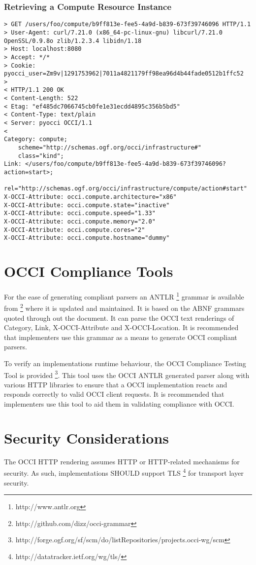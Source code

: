 \documentclass[10pt,a4paper]{article}
\begin{document}
\subsubsection{Retrieving a Compute Resource Instance}
\begin{verbatim}
> GET /users/foo/compute/b9ff813e-fee5-4a9d-b839-673f39746096 HTTP/1.1
> User-Agent: curl/7.21.0 (x86_64-pc-linux-gnu) libcurl/7.21.0 OpenSSL/0.9.8o zlib/1.2.3.4 libidn/1.18
> Host: localhost:8080
> Accept: */*
> Cookie: pyocci_user=Zm9v|1291753962|7011a4821179ff98ea96d4b44fade0512b1ffc52
> 
< HTTP/1.1 200 OK
< Content-Length: 522
< Etag: "ef485dc7066745cb0fe1e31ecdd4895c356b5bd5"
< Content-Type: text/plain
< Server: pyocci OCCI/1.1
< 
Category: compute;
    scheme="http://schemas.ogf.org/occi/infrastructure#"
    class="kind";
Link: </users/foo/compute/b9ff813e-fee5-4a9d-b839-673f39746096?action=start>;
    rel="http://schemas.ogf.org/occi/infrastructure/compute/action#start"
X-OCCI-Attribute: occi.compute.architecture="x86"
X-OCCI-Attribute: occi.compute.state="inactive"
X-OCCI-Attribute: occi.compute.speed="1.33"
X-OCCI-Attribute: occi.compute.memory="2.0"
X-OCCI-Attribute: occi.compute.cores="2"
X-OCCI-Attribute: occi.compute.hostname="dummy"
\end{verbatim}

\section{OCCI Compliance Tools}
For the ease of generating compliant parsers an
ANTLR \footnote{http://www.antlr.org} grammar is available
from \footnote{http://github.com/dizz/occi-grammar} where it is
updated and maintained. It is based on the ABNF grammars quoted
through out the document. It can parse the OCCI text renderings of
Category, Link, X-OCCI-Attribute and X-OCCI-Location. It is
recommended that implementers use this grammar as a means to generate
OCCI compliant parsers.

To verify an implementations runtime behaviour, the OCCI Compliance
Testing Tool is provided
\footnote{http://forge.ogf.org/sf/scm/do/listRepositories/projects.occi-wg/scm}.
This tool uses the OCCI ANTLR generated parser along with various HTTP
libraries to ensure that a OCCI implementation reacts and responds
correctly to valid OCCI client requests. It is recommended that
implementers use this tool to aid them in validating compliance with
OCCI.

\section{Security Considerations}
\label{sec:sec_consid}
The OCCI HTTP rendering assumes HTTP or HTTP-related mechanisms for
security. As such, implementations SHOULD support
TLS \footnote{http://datatracker.ietf.org/wg/tls/} for transport layer
security.
\end{document}
